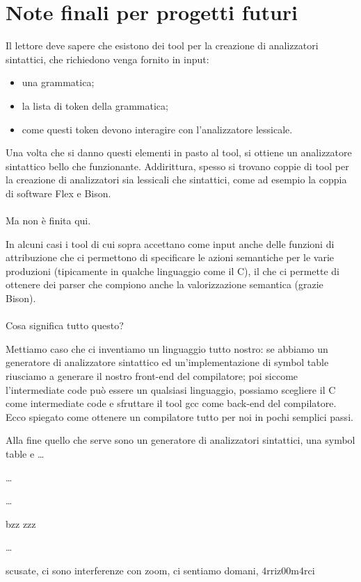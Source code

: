 \documentclass[class=book, crop=false, oneside, 12pt]{standalone}
\begin{document}
\section{Note finali per progetti futuri}
Il lettore deve sapere che esistono dei tool per la creazione di analizzatori sintattici, che richiedono venga fornito in input:
\begin{itemize}
    \item una grammatica;
    \item la lista di token della grammatica; 
    \item come questi token devono interagire con l'analizzatore lessicale.
\end{itemize}
Una volta che si danno questi elementi in pasto al tool, si ottiene un analizzatore sintattico bello che funzionante. Addirittura, spesso si trovano coppie di tool per la creazione di analizzatori sia lessicali che sintattici, come ad esempio la coppia di software Flex e Bison.
\\\\
Ma non è finita qui.

In alcuni casi i tool di cui sopra accettano come input anche delle funzioni di attribuzione che ci permettono di specificare le azioni semantiche per le varie produzioni (tipicamente in qualche linguaggio come il C), il che ci permette di ottenere dei parser che compiono anche la valorizzazione semantica (grazie Bison).
\\\\
Cosa significa tutto questo?

Mettiamo caso che ci inventiamo un linguaggio tutto nostro: se abbiamo un generatore di analizzatore sintattico ed un'implementazione di symbol table riusciamo a generare il nostro front-end del compilatore; poi siccome l'intermediate code può essere un qualsiasi linguaggio, possiamo scegliere il C come intermediate code e sfruttare il tool gcc come back-end del compilatore.
Ecco spiegato come ottenere un compilatore tutto per noi in pochi semplici passi.

Alla fine quello che serve sono un generatore di analizzatori sintattici, una symbol table e \dots


\dots


\dots


bzz zzz

\dots

scusate, ci sono interferenze con zoom, ci sentiamo domani, 4rriz00m4rci 
\end{document}
